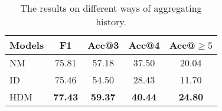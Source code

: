 \begin{table}[th]
	\scriptsize
	\centering
	\begin{tabular}{p{1.5cm}<{\centering}|c|ccc}
	\toprule[1.3pt]
	Models &F1&Acc@3&Acc@4&Acc@$\geq5$\\
	\midrule[1pt]
	NM&75.81&57.18&37.50&20.04 \\	
	ID&75.46&54.50&28.43&11.70\\
	HDM&\textbf{77.43}&\textbf{59.37}&\textbf{40.44}&\textbf{24.80}\\
	\bottomrule[1.3pt]
\end{tabular}
	\vspace{-0.25cm}
	\caption{The results on different ways of aggregating history.}
	\label{tab:historyways}
\end{table}


